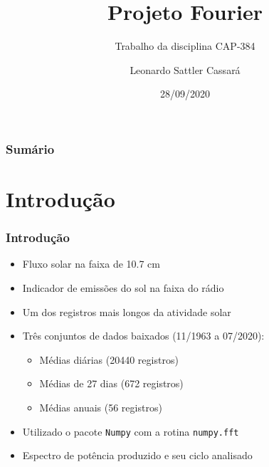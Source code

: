 \documentclass{beamer}
\title{Projeto Fourier}
\subtitle{Trabalho da disciplina CAP-384}
\author{Leonardo Sattler Cassará}
\institute{INPE}
\date{28/09/2020}
\begin{document}
\begin{frame}
\titlepage
\end{frame}

\begin{frame}
\label{contents}
\frametitle{Sumário}
\tableofcontents
\end{frame}

\section{Introdução}

\begin{frame}
\frametitle{Introdução}
\begin{itemize}
\item Fluxo solar na faixa de 10.7 cm
\item Indicador de emissões do sol na faixa do rádio
\item Um dos registros mais longos da atividade solar 
\item Três conjuntos de dados baixados (11/1963 a 07/2020):
\begin{itemize}
\item Médias diárias (20440 registros)
\item Médias de 27 dias (672 registros)
\item Médias anuais (56 registros)
\end{itemize}
\item Utilizado o pacote \texttt{Numpy} com a rotina \texttt{numpy.fft}
\item Espectro de potência produzido e seu ciclo analisado
\end{itemize}
\end{frame}

\end{document}
